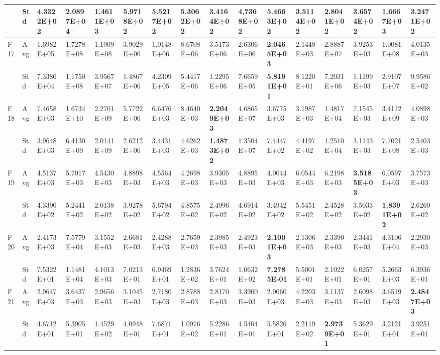 \documentclass{article} %
\begin{document}
\begin{tabular}{|p{0.3in}|p{0.3in}|p{0.3in}|p{0.3in}|p{0.3in}|p{0.3in}|p{0.3in}|p{0.3in}|p{0.3in}|p{0.3in}|p{0.3in}|p{0.3in}|p{0.3in}|p{0.3in}|p{0.3in}|p{0.5in}|}
 & Std & 4.3322E+02 & 2.0897E+04 & 1.4611E+03 & 5.9718E+02 & 5.5217E+02 & 5.3062E+02 & 3.4164E+02 & 4.7368E+02 & 5.4663E+02 & 3.5114E+02 & \textbf{2.8041E+02} & 3.6574E+02 & 1.6667E+03 & 3.2471E+02 \\ \hline 
F17 & Avg & 1.6982E+05 & 1.7278E+08 & 1.1909E+08 & 3.9029E+06 & 1.0148E+06 & 8.6708E+06 & 3.5173E+06 & 2.6306E+06 & \textbf{2.0465E+03} & 2.1448E+03 & 2.8887E+07 & 3.9253E+03 & 1.0081E+08 & 4.0135E+03 \\ \hline 
 & Std & 7.3380E+04 & 1.1750E+08 & 3.9567E+07 & 1.4867E+06 & 4.2309E+05 & 5.4417E+06 & 1.2295E+06 & 7.6659E+05 & \textbf{5.8191E+01} & 8.1220E+01 & 7.2031E+06 & 1.1199E+03 & 2.9107E+07 & 9.9586E+02 \\ \hline 
F18 & Avg & 7.4658E+03 & 1.6734E+10 & 2.2701E+09 & 5.7722E+06 & 6.6476E+03 & 8.4640E+03 & \textbf{2.2049E+03} & 4.6865E+07 & 3.6775E+03 & 3.1987E+03 & 1.4817E+04 & 7.1545E+03 & 3.4112E+09 & 4.0898E+03 \\ \hline 
 & Std & 3.9648E+03 & 6.4130E+09 & 2.0141E+09 & 2.6212E+06 & 3.4431E+03 & 4.6262E+03 & \textbf{1.4873E+02} & 1.3504E+07 & 7.4447E+02 & 4.4197E+02 & 1.2510E+04 & 3.1143E+03 & 7.7021E+08 & 2.5403E+03 \\ \hline 
F19 & Avg & 4.5137E+03 & 5.7017E+03 & 4.5430E+03 & 4.8898E+03 & 4.5564E+03 & 4.2698E+03 & 3.9305E+03 & 4.8895E+03 & 4.0044E+03 & 6.0544E+03 & 6.2198E+03 & \textbf{3.5185E+03} & 6.0597E+03 & 3.7573E+03 \\ \hline 
 & Std & 4.3390E+02 & 5.2441E+02 & 2.0138E+02 & 3.9278E+02 & 5.6794E+02 & 4.8575E+02 & 2.4996E+02 & 4.6914E+02 & 3.4942E+02 & 5.5451E+02 & 2.4528E+02 & 3.5033E+02 & \textbf{1.8391E+02} & 2.6260E+02 \\ \hline 
F20 & Avg & 2.4173E+03 & 7.5779E+04 & 3.1552E+03 & 2.6681E+03 & 2.4288E+03 & 2.7659E+03 & 2.3985E+03 & 2.4923E+03 & \textbf{2.1001E+03} & 2.1306E+03 & 2.3390E+03 & 2.3441E+03 & 4.3106E+04 & 2.2930E+03 \\ \hline 
 & Std & 7.5322E+01 & 1.1481E+04 & 4.1013E+03 & 7.0213E+01 & 6.9469E+01 & 1.2836E+02 & 3.7624E+01 & 1.0632E+02 & \textbf{7.2785E-01} & 5.5001E+01 & 2.1022E+01 & 6.0257E+01 & 5.2663E+03 & 6.3936E+01 \\ \hline 
F21 & Avg & 2.9647E+03 & 3.6437E+03 & 2.9656E+03 & 3.1045E+03 & 2.7180E+03 & 2.8788E+03 & 2.8170E+03 & 3.3900E+03 & 2.9060E+03 & 4.2203E+03 & 3.1137E+03 & 2.6098E+03 & 3.6519E+03 & \textbf{2.4847E+03} \\ \hline 
 & Std & 4.6712E+01 & 5.3905E+01 & 1.4529E+02 & 4.0948E+01 & 7.6871E+01 & 1.0976E+02 & 5.2286E+01 & 4.5464E+01 & 5.5826E+01 & 2.2119E+02 & \textbf{2.9739E+01} & 5.3629E+01 & 3.2121E+01 & 3.9251E+01 \\ \hline 

\end{tabular}
\end{document}
